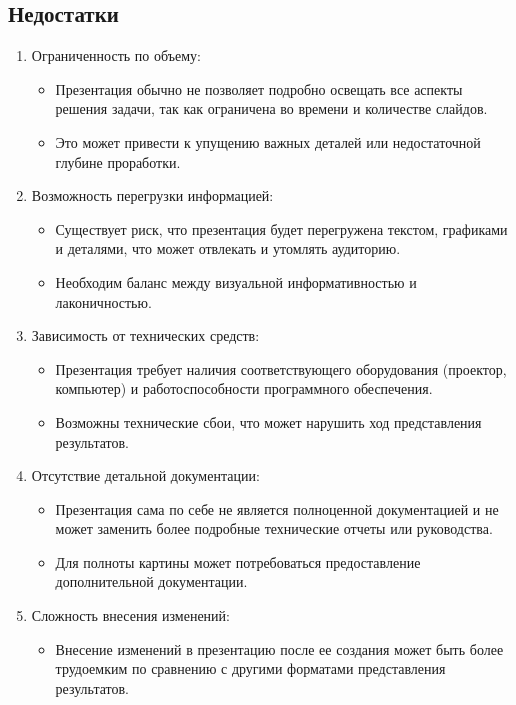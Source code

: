     \subsection{Недостатки}
    \begin{enumerate}
        \item Ограниченность по объему:
            \begin{itemize}
                \item Презентация обычно не позволяет подробно освещать все аспекты решения задачи, так как ограничена во времени и количестве слайдов.
                \item Это может привести к упущению важных деталей или недостаточной глубине проработки.
            \end{itemize}
        \item Возможность перегрузки информацией:
            \begin{itemize}
                \item Существует риск, что презентация будет перегружена текстом, графиками и деталями, что может отвлекать и утомлять аудиторию.
                \item Необходим баланс между визуальной информативностью и лаконичностью.
            \end{itemize}
        \item Зависимость от технических средств:
            \begin{itemize}
                \item Презентация требует наличия соответствующего оборудования (проектор, компьютер) и работоспособности программного обеспечения.
                \item Возможны технические сбои, что может нарушить ход представления результатов.
            \end{itemize}
        \item Отсутствие детальной документации:
            \begin{itemize}
                \item Презентация сама по себе не является полноценной документацией и не может заменить более подробные технические отчеты или руководства.
                \item Для полноты картины может потребоваться предоставление дополнительной документации.
            \end{itemize}
        \item Сложность внесения изменений:
            \begin{itemize}
                \item Внесение изменений в презентацию после ее создания может быть более трудоемким по сравнению с другими форматами представления результатов.
            \end{itemize}
    \end{enumerate}

